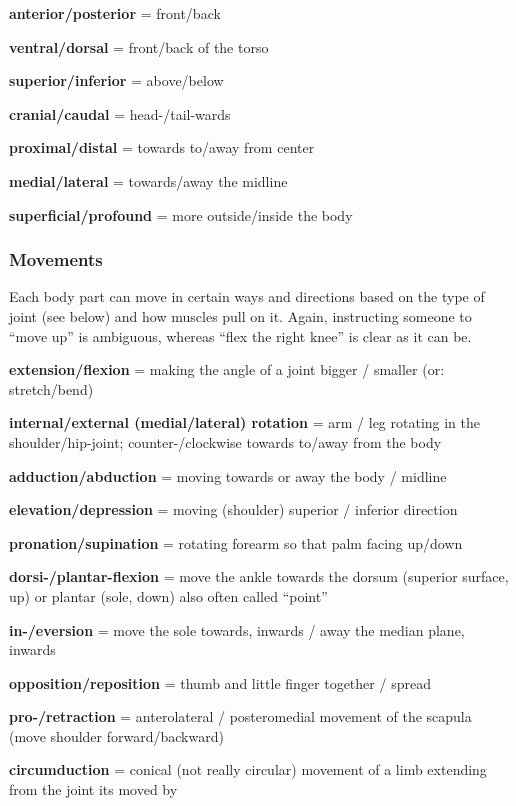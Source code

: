 \begin{itemize*}
    \item \textbf{anterior/posterior} = front/back
    \item \textbf{ventral/dorsal} = front/back of the torso
    \item \textbf{superior/inferior} = above/below
    \item \textbf{cranial/caudal} = head-/tail-wards
    \item \textbf{proximal/distal} = towards to/away from center
    \item \textbf{medial/lateral} = towards/away the midline
    \item \textbf{superficial/profound} = more outside/inside the body
\end{itemize*}

\subsubsection{Movements}

Each body part can move in certain ways and directions based on the type of joint (see below) and how muscles pull on it.
Again, instructing someone to ``move up'' is ambiguous, whereas ``flex the right knee'' is clear as it can be.

\begin{itemize*}
    \item \textbf{extension/flexion} = making the angle of a joint bigger / smaller (or: stretch/bend)
    \item \textbf{internal/external (medial/lateral) rotation} = arm / leg rotating in the shoulder/hip-joint; counter-/clockwise towards to/away from the body
    \item \textbf{adduction/abduction} = moving towards or away the body / midline
    \item \textbf{elevation/depression} = moving (shoulder) superior / inferior direction
    \item \textbf{pronation/supination} = rotating forearm so that palm facing up/down
    \item \textbf{dorsi-/plantar-flexion} = move the ankle towards the dorsum (superior surface, up) or plantar (sole, down) also often called ``point''
    \item \textbf{in-/eversion} = move the sole towards, inwards / away the median plane, inwards
    \item \textbf{opposition/reposition} = thumb and little finger together / spread
    \item \textbf{pro-/retraction} = anterolateral / posteromedial movement of the scapula (move shoulder forward/backward)
    \item \textbf{circumduction} = conical (not really circular) movement of a limb extending from the joint its moved by
\end{itemize*}

